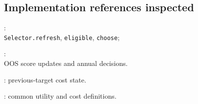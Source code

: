 \documentclass[11pt,a4paper]{article}
\begin{document}
\subsection*{Implementation references inspected}
\noindent{}:\\
\texttt{Selector.refresh}, \texttt{eligible}, \texttt{choose};

\noindent{}:\\
OOS score updates and annual decisions.

\noindent{}: previous-target cost state.

\noindent{}: common utility and cost definitions.
\end{document}
